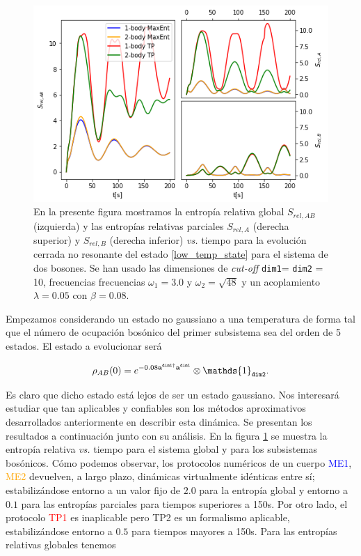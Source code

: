 \documentclass{report} %
\numberwithin{equation}{section}
\begin{document}
\begin{figure}
    \centering
    \includegraphics[scale = 0.7]{figs/section3_4/section5_bxb_low-closed_nonres/bxb_low_closed_nr_rel-entropy.png}
    \caption{En la presente figura mostramos la entropía relativa global $S_{rel,AB}$ (izquierda) y las entropías relativas parciales  $S_{rel,A}$ (derecha superior) y $S_{rel,B}$ (derecha inferior) \textit{vs.} tiempo para la evolución cerrada no resonante del estado \eqref{low_temp_state} para el sistema de dos bosones. Se han usado las dimensiones de \textit{cut-off} \texttt{dim1}= \texttt{dim2} = 10, frecuencias frecuencias $\omega_1 = 3.0$ y $\omega_2 =\sqrt{48}$ y un acoplamiento $\lambda = 0.05$ con $\beta=0.08$.}
    \label{low_temp_rel-entropy}
\end{figure}

Empezamos considerando un estado no gaussiano a una temperatura de forma tal que el número de ocupación bosónico del primer subsistema sea del orden de 5 estados. El estado a evolucionar será

\begin{equation}
    \rho_{AB}(0) = e^{-0.08{\bf a}^{\texttt{dim1}\dagger} {\bf a}^{\texttt{dim1}}} \otimes \mathds{1}_{\textnormal{\texttt{dim2}}}. \label{low_temp_state}
\end{equation}

Es claro que dicho estado está lejos de ser un estado gaussiano. Nos interesará estudiar que tan aplicables y confiables son los métodos aproximativos desarrollados anteriormente en describir esta dinámica. Se presentan los resultados a continuación junto con su análisis. 
En la figura \ref{low_temp_rel-entropy} se muestra la entropía relativa \textit{vs.} tiempo para el sistema global y para los subsistemas bosónicos.
Cómo podemos observar, los protocolos numéricos de un cuerpo \textcolor{blue}{ME1}, \textcolor{orange}{ME2} devuelven, a largo plazo, dinámicas virtualmente idénticas entre sí; estabilizándose entorno a un valor fijo de $2.0$ para la entropía global y entorno a $0.1$ para las entropías parciales para tiempos superiores a 150s.
Por otro lado, el protocolo \textcolor{red}{TP1} es inaplicable pero \textcolor{dark green}{TP2} es un formalismo aplicable, estabilizándose entorno a $0.5$ para tiempos mayores a 150s. Para las entropías relativas globales tenemos
\end{document}
